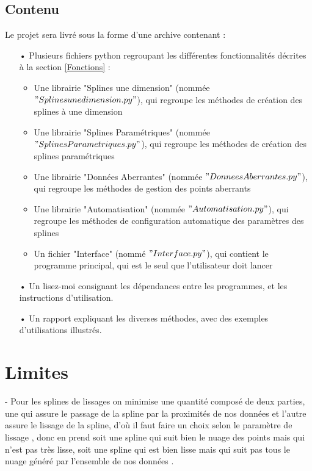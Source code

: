 \documentclass[a4paper,12pt]{article}
\begin{document}
\newpage 
\subsection*{Contenu}
Le projet sera livré sous la forme d'une archive contenant :
\begin{itemize}
\item[•] Plusieurs fichiers python regroupant les différentes fonctionnalités décrites à la section \ref{Fonctions}  : 
\begin{itemize}
\item Une librairie "Splines une dimension" (nommée $"Splinesune dimension.py"$), qui regroupe les méthodes de création des splines à une dimension
\item Une librairie "Splines Paramétriques" (nommée $"SplinesParametriques.py"$), qui regroupe les méthodes de création des splines paramétriques
\item Une librairie "Données Aberrantes" (nommée $"DonneesAberrantes.py"$), qui regroupe les méthodes de gestion des points aberrants
\item Une librairie "Automatisation" (nommée $"Automatisation.py"$), qui regroupe les méthodes de configuration automatique des paramètres des splines
\item Un fichier "Interface" (nommé $"Interface.py"$), qui contient le programme principal, qui est le seul que l'utilisateur doit lancer
\end{itemize}
\item[•] Un lisez-moi consignant les dépendances entre les programmes, et les instructions d'utilisation.
\item[•] Un rapport expliquant les diverses méthodes, avec des exemples d’utilisations illustrés.
\end{itemize}

\newpage
\section{Limites}

-          Pour les splines de lissages on minimise une quantité composé de deux parties, une qui assure le passage de la spline par la proximités de nos données  et l’autre assure le lissage de la spline, d’où  il faut faire un choix selon le paramètre de lissage , donc en prend soit une spline qui suit bien le nuage des points mais qui n’est pas très lisse, soit une spline qui est bien lisse mais qui suit pas tous le nuage généré par l’ensemble de nos données   .
 
\end{document}
